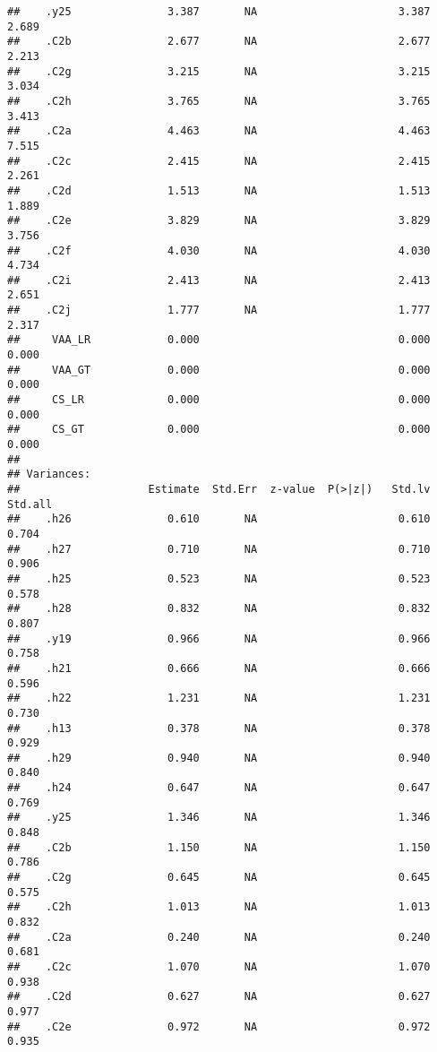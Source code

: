\documentclass[
]{article}
\begin{document}
\begin{verbatim}
##    .y25               3.387       NA                      3.387    2.689
##    .C2b               2.677       NA                      2.677    2.213
##    .C2g               3.215       NA                      3.215    3.034
##    .C2h               3.765       NA                      3.765    3.413
##    .C2a               4.463       NA                      4.463    7.515
##    .C2c               2.415       NA                      2.415    2.261
##    .C2d               1.513       NA                      1.513    1.889
##    .C2e               3.829       NA                      3.829    3.756
##    .C2f               4.030       NA                      4.030    4.734
##    .C2i               2.413       NA                      2.413    2.651
##    .C2j               1.777       NA                      1.777    2.317
##     VAA_LR            0.000                               0.000    0.000
##     VAA_GT            0.000                               0.000    0.000
##     CS_LR             0.000                               0.000    0.000
##     CS_GT             0.000                               0.000    0.000
## 
## Variances:
##                    Estimate  Std.Err  z-value  P(>|z|)   Std.lv  Std.all
##    .h26               0.610       NA                      0.610    0.704
##    .h27               0.710       NA                      0.710    0.906
##    .h25               0.523       NA                      0.523    0.578
##    .h28               0.832       NA                      0.832    0.807
##    .y19               0.966       NA                      0.966    0.758
##    .h21               0.666       NA                      0.666    0.596
##    .h22               1.231       NA                      1.231    0.730
##    .h13               0.378       NA                      0.378    0.929
##    .h29               0.940       NA                      0.940    0.840
##    .h24               0.647       NA                      0.647    0.769
##    .y25               1.346       NA                      1.346    0.848
##    .C2b               1.150       NA                      1.150    0.786
##    .C2g               0.645       NA                      0.645    0.575
##    .C2h               1.013       NA                      1.013    0.832
##    .C2a               0.240       NA                      0.240    0.681
##    .C2c               1.070       NA                      1.070    0.938
##    .C2d               0.627       NA                      0.627    0.977
##    .C2e               0.972       NA                      0.972    0.935

\end{verbatim}
\end{document}

